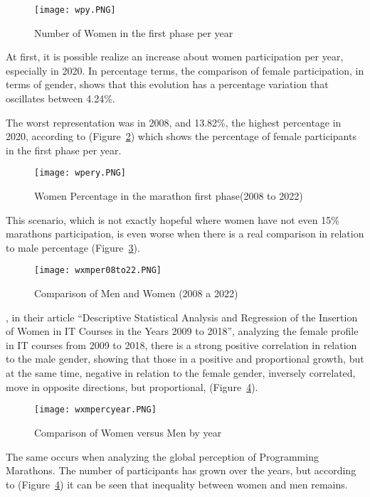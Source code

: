 \documentclass[12pt]{article}
\begin{document}
\begin{figure}[ht!]
\centering
\texttt{[image: wpy.PNG]}
\caption{Number of Women in the first phase per year}
\label{fig:exampleFig2}
\end{figure}
At first, it is possible realize an increase about women participation per year, especially in 2020.
In percentage terms, the comparison of female participation, in terms of gender, shows that this evolution has a percentage variation that oscillates between 4.24\%. 

The worst representation was in 2008, and 13.82\%, the highest percentage in 2020, according to (Figure~\ref{fig:exampleFig3}) which shows the percentage of female participants in the first phase per year.

\begin{figure}[ht!]
\centering
\texttt{[image: wpery.PNG]}
\caption{Women Percentage in the marathon first phase(2008 to 2022)}
\label{fig:exampleFig3}
\end{figure}

This scenario, which is not exactly hopeful where women have not even 15\% marathons participation, is even worse when there is a real comparison in relation to male percentage (Figure~\ref{fig:exampleFig4}).
\begin{figure}[ht!]
\centering
\texttt{[image: wxmper08to22.PNG]}
\caption{Comparison of Men and Women (2008 a 2022)}
\label{fig:exampleFig4}
\end{figure}

\cite{Cursino:21}, in their article “Descriptive Statistical Analysis and Regression of the Insertion of Women in IT Courses in the Years 2009 to 2018”, analyzing the female profile in IT courses from 2009 to 2018, there is a strong positive correlation in relation to the male gender, showing that those in a positive and proportional growth, but at the same time, negative in relation to the female gender, inversely correlated, move in opposite directions, but proportional, (Figure~\ref{fig:exampleFig5}). 
\begin{figure}[ht!]
\centering
\texttt{[image: wxmpercyear.PNG]}
\caption{Comparison of Women versus Men by year}
\label{fig:exampleFig5}
\end{figure}
The same occurs when analyzing the global perception of Programming Marathons. The number of participants has grown over the years, but according to (Figure~\ref{fig:exampleFig5}) it can be seen that inequality between women and men remains.
\end{document}
